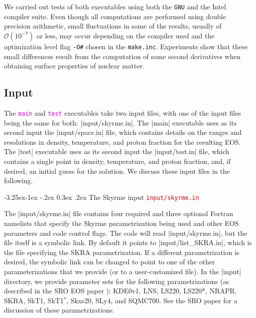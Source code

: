 \documentclass[letterpaper,11pt]{refart}
\makeatletter
\renewcommand\subsubsection{\@startsection{subsubsection}{3}{\z@}%
                           {-3.25ex\@plus -1ex \@minus -.2ex}%
                           {0.3ex \@plus .2ex}%
                           {\normalfont\normalsize\bf\fontsize{11}{13}\selectfont}}
\makeatother
\begin{document}
We carried out tests of both executables using both the \texttt{GNU}
and the Intel compiler suite.  Even though all computations are
performed using double precision arithmetic, small fluctuations in
some of the results, usually of $\mathcal{O}(10^{-7})$ or less, may
occur depending on the compiler used and the optimization level flag
\verb|-O#| chosen in the \texttt{make.inc}. Experiments show that
these small differences result from the computation of some second
derivatives when obtaining surface properties of nuclear matter.


\subsection{Input}\label{ssec:SNA_in}

The \texttt{\textcolor{magenta}{main}} and
\texttt{\textcolor{magenta}{test}} executables take two input files,
with one of the input files being the same for both:
\verbfile|input/skyrme.in|.  The \verbexec|main| executable uses as its 
second input the \verbfile|input/space.in|
file, which contains details on the ranges and resolutions in density,
temperature, and proton fraction for the resulting EOS. The
\verbexec|test| executable uses as its second input the
\verbfile|input/test.in| file, which contains a single point in
density, temperature, and proton fraction, and, if desired, an initial
guess for the solution.  We discuss these input files in the
following.




\subsubsection{The Skyrme input \textcolor{red}{\texttt{input/skyrme.in}}}
\label{sssec:skyrme.in}

\sloppy The \verbfile|input/skyrme.in| file contains four required and
three optional Fortran namelists that specify the Skyrme
parametrization being used and other EOS parameters and code control
flags.  The code will read \verbfile|input/skyrme.in|, but the file
itself is a symbolic link.  By default it points to
\verbfile|input/list_SKRA.in|, which is the file specifying the SKRA
parametrization.  If a different parametrization is desired, the
symbolic link can be changed to point to one of the other
parameterizations that we provide (or to a user-customized file).  In
the \verbfile|input| directory, we provide parameter sets for the
following parametrizations (as described in the SRO EOS paper
\cite{schneider:17}): KDE0v1, LNS, LS220, LS220*, NRAPR, SKRA, SkT1,
SkT1$^*$, Skxs20, SLy4, and SQMC700. See the SRO paper
\cite{schneider:17} for a discussion of these parametrizations.
\end{document}
